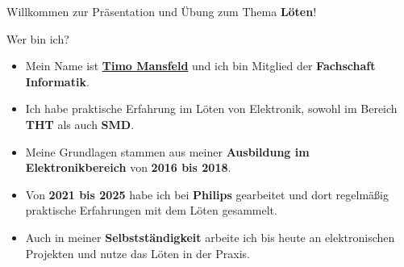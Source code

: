 \begin{frame}
    \begin{center}
    Willkommen zur Präsentation und Übung zum Thema \textbf{Löten}!
    \end{center}
\end{frame}

\begin{frame}{Wer bin ich?}
\begin{itemize}\setlength{\itemsep}{3mm}
    \item Mein Name ist \underline{\textbf{Timo Mansfeld}} und ich bin Mitglied der \textbf{Fachschaft Informatik}.
    \item Ich habe praktische Erfahrung im Löten von Elektronik, sowohl im Bereich \textbf{THT} als auch \textbf{SMD}.
    \item Meine Grundlagen stammen aus meiner \textbf{Ausbildung im Elektronikbereich} von \textbf{2016 bis 2018}.
    \item Von \textbf{2021 bis 2025} habe ich bei \textbf{Philips} gearbeitet und dort regelmäßig praktische Erfahrungen mit dem Löten gesammelt.
    \item Auch in meiner \textbf{Selbstständigkeit} arbeite ich bis heute an elektronischen Projekten und nutze das Löten in der Praxis.
\end{itemize}
\end{frame}
